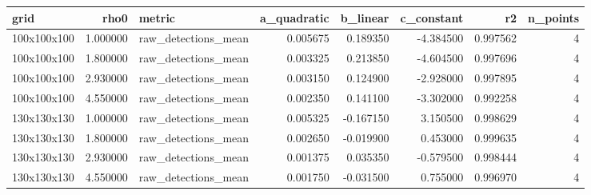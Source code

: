 \begin{tabular}{lrlrrrrr}
\toprule
grid & rho0 & metric & a_quadratic & b_linear & c_constant & r2 & n_points \\
\midrule
100x100x100 & 1.000000 & raw_detections_mean & 0.005675 & 0.189350 & -4.384500 & 0.997562 & 4 \\
100x100x100 & 1.800000 & raw_detections_mean & 0.003325 & 0.213850 & -4.604500 & 0.997696 & 4 \\
100x100x100 & 2.930000 & raw_detections_mean & 0.003150 & 0.124900 & -2.928000 & 0.997895 & 4 \\
100x100x100 & 4.550000 & raw_detections_mean & 0.002350 & 0.141100 & -3.302000 & 0.992258 & 4 \\
130x130x130 & 1.000000 & raw_detections_mean & 0.005325 & -0.167150 & 3.150500 & 0.998629 & 4 \\
130x130x130 & 1.800000 & raw_detections_mean & 0.002650 & -0.019900 & 0.453000 & 0.999635 & 4 \\
130x130x130 & 2.930000 & raw_detections_mean & 0.001375 & 0.035350 & -0.579500 & 0.998444 & 4 \\
130x130x130 & 4.550000 & raw_detections_mean & 0.001750 & -0.031500 & 0.755000 & 0.996970 & 4 \\
\bottomrule
\end{tabular}
